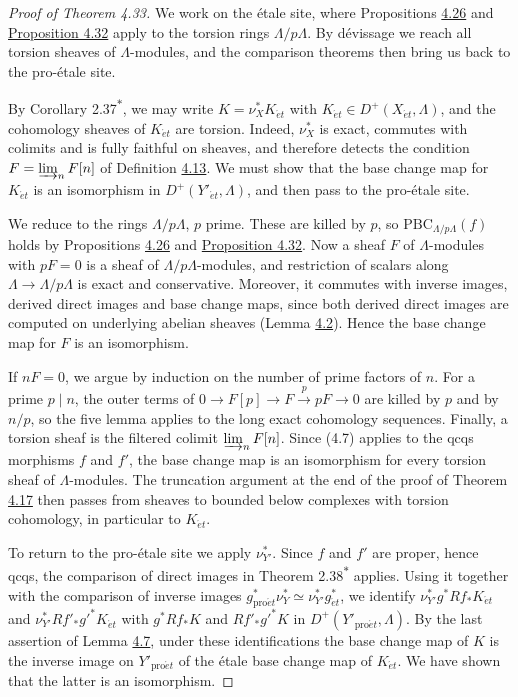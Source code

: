 \documentclass[11pt]{article}
\newcommand{\bpout}[1]{#1\textsuperscript{\hyperlink{bp-outside}{\ensuremath{\ast}}}}
\begin{document}
\begin{proof}[{Proof of Theorem 4.33}]\label{bp100}%
We work on the étale site, where Propositions \hyperref[bp76]{4.26} and \hyperref[bp94]{Proposition 4.32} apply to the torsion rings \(\Lambda/p\Lambda\). By dévissage we reach all torsion sheaves of \(\Lambda\)-modules, and the comparison theorems then bring us back to the pro-étale site.

By Corollary \bpout{2.37}, we may write \(K=\nu_X^*K_{\acute{e}t}\) with \(K_{\acute{e}t}\in D^+(X_{\acute{e}t},\Lambda)\), and the cohomology sheaves of \(K_{\acute{e}t}\) are torsion. Indeed, \(\nu_X^*\) is exact, commutes with colimits and is fully faithful on sheaves, and therefore detects the condition \(F=\varinjlim_nF[n]\) of Definition \hyperref[bp36]{4.13}. We must show that the base change map for \(K_{\acute{e}t}\) is an isomorphism in \(D^+(Y'_{\acute{e}t},\Lambda)\), and then pass to the pro-étale site.

We reduce to the rings \(\Lambda/p\Lambda\), \(p\) prime. These are killed by \(p\), so \(\mathrm{PBC}_{\Lambda/p\Lambda}(f)\) holds by Propositions \hyperref[bp76]{4.26} and \hyperref[bp94]{Proposition 4.32}. Now a sheaf \(F\) of \(\Lambda\)-modules with \(pF=0\) is a sheaf of \(\Lambda/p\Lambda\)-modules, and restriction of scalars along \(\Lambda\to\Lambda/p\Lambda\) is exact and conservative. Moreover, it commutes with inverse images, derived direct images and base change maps, since both derived direct images are computed on underlying abelian sheaves (Lemma \hyperref[bp8]{4.2}). Hence the base change map for \(F\) is an isomorphism.

If \(nF=0\), we argue by induction on the number of prime factors of \(n\). For a prime \(p\mid n\), the outer terms of \(0\to F[p]\to F\xrightarrow{p}pF\to0\) are killed by \(p\) and by \(n/p\), so the five lemma applies to the long exact cohomology sequences. Finally, a torsion sheaf is the filtered colimit \(\varinjlim_nF[n]\). Since (4.7) applies to the qcqs morphisms \(f\) and \(f'\), the base change map is an isomorphism for every torsion sheaf of \(\Lambda\)-modules. The truncation argument at the end of the proof of Theorem \hyperref[bp45]{4.17} then passes from sheaves to bounded below complexes with torsion cohomology, in particular to \(K_{\acute{e}t}\).

To return to the pro-étale site we apply \(\nu_{Y'}^*\). Since \(f\) and \(f'\) are proper, hence qcqs, the comparison of direct images in Theorem \bpout{2.38} applies. Using it together with the comparison of inverse images \(g_{\mathrm{pro}\acute{e}t}^*\nu_Y^*\simeq\nu_{Y'}^*g_{\acute{e}t}^*\), we identify \(\nu_{Y'}^*g^*Rf_*K_{\acute{e}t}\) and \(\nu_{Y'}^*Rf'_*g'^*K_{\acute{e}t}\) with \(g^*Rf_*K\) and \(Rf'_*g'^*K\) in \(D^+(Y'_{\mathrm{pro}\acute{e}t},\Lambda)\). By the last assertion of Lemma \hyperref[bp20]{4.7}, under these identifications the base change map of \(K\) is the inverse image on \(Y'_{\mathrm{pro}\acute{e}t}\) of the étale base change map of \(K_{\acute{e}t}\). We have shown that the latter is an isomorphism.
\end{proof}
\end{document}
